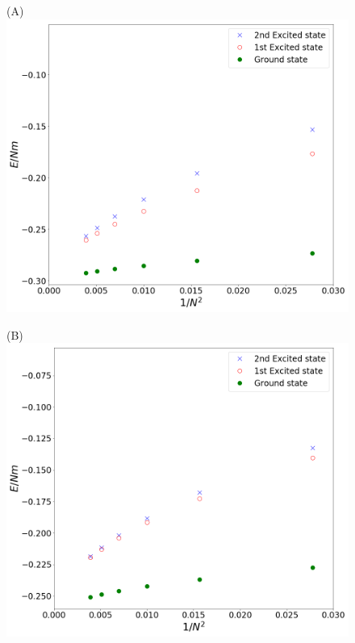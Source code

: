 \begin{figure}
	\begin{minipage}{.5\textwidth}
		\centering(A)
		\includegraphics[scale=0.18]{figures/ExcitedStatesEven_m2_N-2.png}
	\end{minipage}%
	\begin{minipage}{0.5\textwidth}
		\centering(B)
		\includegraphics[scale=0.18]{figures/ExcitedStatesEven_m4_N-2.png}
	\end{minipage}
	\begin{minipage}{.5\textwidth}

\end{minipage}
\end{figure}
